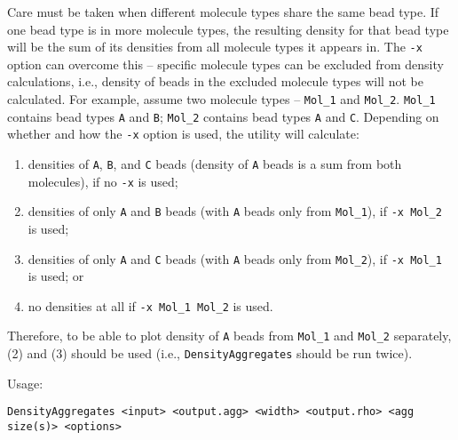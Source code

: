 Care must be taken when different molecule types share the same bead type.
If one bead type is in more molecule types, the resulting density for that
bead type will be the sum of its densities from all molecule types it
appears in. The \texttt{-x} option can overcome this -- specific molecule
types can be excluded from density calculations, i.e., density of beads in
the excluded molecule types will not be calculated.  For example, assume
two molecule types -- \texttt{Mol\_1} and \texttt{Mol\_2}.  \texttt{Mol\_1}
contains bead types \texttt{A} and \texttt{B}; \texttt{Mol\_2} contains
bead types \texttt{A} and \texttt{C}.  Depending on whether and how the
\texttt{-x} option is used, the utility will calculate:
\begin{enumerate}[nosep]
  \item densities of \texttt{A}, \texttt{B}, and \texttt{C} beads (density of
    \texttt{A} beads is a sum from both molecules), if no \texttt{-x} is used;
  \item densities of only \texttt{A} and \texttt{B} beads (with \texttt{A}
    beads only from \texttt{Mol\_1}), if \texttt{-x Mol\_2} is used;
  \item densities of only \texttt{A} and \texttt{C} beads (with \texttt{A}
    beads only from \texttt{Mol\_2}), if \texttt{-x Mol\_1} is used; or
  \item no densities at all if \texttt{-x Mol\_1 Mol\_2} is used.
\end{enumerate}
Therefore, to be able to plot density of \texttt{A} beads from
\texttt{Mol\_1} and \texttt{Mol\_2} separately, (2) and (3) should be used
(i.e., \texttt{DensityAggregates} should be run twice).

Usage:

\vspace{1em}
\noindent
\texttt{DensityAggregates <input> <output.agg> <width> <output.rho> <agg \\
size(s)> <options>}

